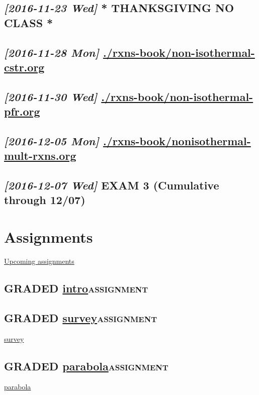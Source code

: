 \documentclass[11pt]{article}
\begin{document}
\subsection{\textit{[2016-11-23 Wed] } * THANKSGIVING NO CLASS *}
\label{sec:orgheadline42}

\subsection{\textit{[2016-11-28 Mon] } \url{./rxns-book/non-isothermal-cstr.org}}
\label{sec:orgheadline43}

\subsection{\textit{[2016-11-30 Wed] } \url{./rxns-book/non-isothermal-pfr.org}}
\label{sec:orgheadline44}

\subsection{\textit{[2016-12-05 Mon] } \url{./rxns-book/nonisothermal-mult-rxns.org}}
\label{sec:orgheadline45}

\subsection{\textit{[2016-12-07 Wed] } EXAM 3 (Cumulative through 12/07)}
\label{sec:orgheadline46}

\section{Assignments}
\label{assignments}
\href{tq-agenda}{Upcoming assignments}

\subsection{{\bfseries\sffamily GRADED} \url{intro}\hfill{}\textsc{assignment}}
\label{intro}


\subsection{{\bfseries\sffamily GRADED} \url{survey}\hfill{}\textsc{assignment}}
\label{survey}
\url{survey}

\subsection{{\bfseries\sffamily GRADED} \url{parabola}\hfill{}\textsc{assignment}}
\label{parabola}
\url{parabola}
\end{document}
